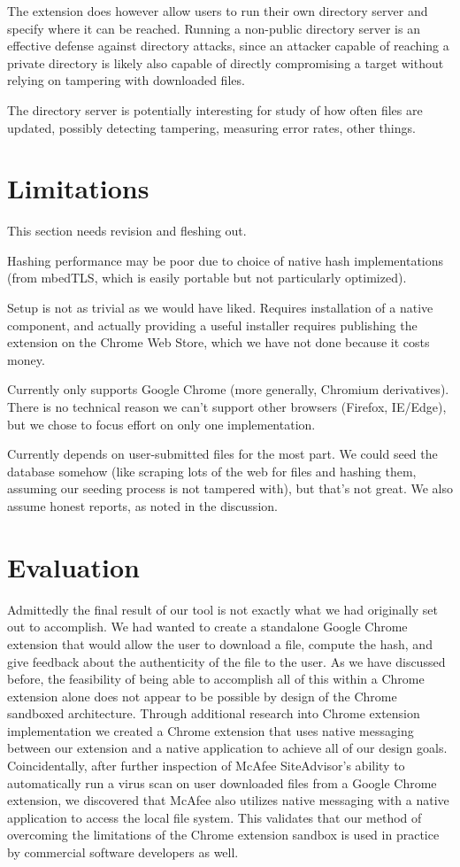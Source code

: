 \documentclass[letterpaper,twocolumn,10pt]{article}
\begin{document}
The extension does however allow users to run their own directory server and specify where it can be reached. Running a non-public directory server is an effective defense against directory attacks, since an attacker capable of reaching a private directory is likely also capable of directly compromising a target without relying on tampering with downloaded files.

The directory server is potentially interesting for study of how often files are updated, possibly detecting tampering, measuring error rates, other things.

\section{Limitations}

This section needs revision and fleshing out.

Hashing performance may be poor due to choice of native hash implementations (from mbedTLS, which is easily portable but not particularly optimized).

Setup is not as trivial as we would have liked. Requires installation of a native component, and actually providing a useful installer requires publishing the extension on the Chrome Web Store, which we have not done because it costs money.

Currently only supports Google Chrome (more generally, Chromium derivatives). There is no technical reason we can't support other browsers (Firefox, IE/Edge), but we chose to focus effort on only one implementation.

Currently depends on  user-submitted files for the most part. We could seed the database somehow (like scraping lots of the web for files and hashing them, assuming our seeding process is not tampered with), but that’s not great. We also assume honest reports, as noted in the discussion.

\section{Evaluation}
Admittedly the final result of our tool is not exactly what we had originally set out to accomplish. We had wanted to create a standalone Google Chrome extension that would allow the user to download a file, compute the hash, and give feedback about the authenticity of the file to the user. As we have discussed before, the feasibility of being able to accomplish all of this within a Chrome extension alone does not appear to be possible by design of the Chrome sandboxed architecture. Through additional research into Chrome extension implementation we created a Chrome extension that uses native messaging between our extension and a native application to achieve all of our design goals. Coincidentally, after further inspection of McAfee SiteAdvisor's ability to automatically run a virus scan on user downloaded files from a Google Chrome extension, we discovered that McAfee also utilizes native messaging with a native application to access the local file system. This validates that our method of overcoming the limitations of the Chrome extension sandbox is used in practice by commercial software developers as well.
\end{document}
